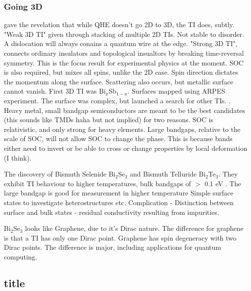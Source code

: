 \documentclass{article} %
\newcommand{\bismuthselinide}[1]{Bi$_2$Se$_3$#1}
\begin{document}
\subsubsection{Going 3D}
\begin{outline}
	 gave the revelation that while QHE doesn't go 2D to 3D, the TI does, subtly. \cite{fu_topological_2007, moore_topological_2007, roy_topological_2009}
	\1 "Weak 3D TI" given through stacking of multiple 2D TIs. Not stable to disorder. A dislocation will always conains a quantum wire at the edge.
	\1 "Strong 3D TI", connects ordinary insulators and topological insualtors by breaking time-reversal symmetry. \cite{moore_topological_2007} This is the focus result for experimental physics at the moment.
	\1 SOC is also required, but mixes all spins, unlike the 2D case. Spin direction dictates the momentum along the surface. Scattering also occurs, but metallic surface cannot vanish.
	\1 First 3D TI was Bi$_x$Sb$_{1-x}$. Surfaces mapped using ARPES experiment. The surface was complex, but launched a search for other TIs. \cite{hsieh_topological_2008,hsieh_observation_2009}.
	\1 Heavy metal, small bandgap semiconductors are meant to be the best candidates (this sounds like TMDs haha but not implied) for two reasons.
		\2 SOC is relativistic, and only strong for heavy elements.
		\2 Large bandgaps, relative to the scale of SOC, will not allow SOC to change the phase. This is because bands either need to invert or be able to cross or change properties by local deformation (I think).
	
	\1 The discovery of Bismuth Selenide Bi$_2$Se$_3$ and Bismuth Telluride Bi$_2$Te$_3$. They exhibit TI behaviour to higher temperatures, bulk bandgaps of $>$ 0.1 eV \cite{xia_observation_2009,zhang_topological_2009,chen_experimental_2009}.
 		\2 The large bandgap is good for measurement in higher temperature
 		\2 Simple surface states to investigate heterostructures etc. 
 		\2 Complication - Distinction between surface and bulk states - residual conductivity resulting from impurities.
	
	\1 \bismuthselinide{} looks like Graphene, due to it's Dirac nature. The difference for graphene is that a TI has only one Dirac point. Graphene has spin degeneracy with two Dirac points. The difference is major, including applications for quantum computing.
	
	
\end{outline}


\subsection{title}




\end{document}
